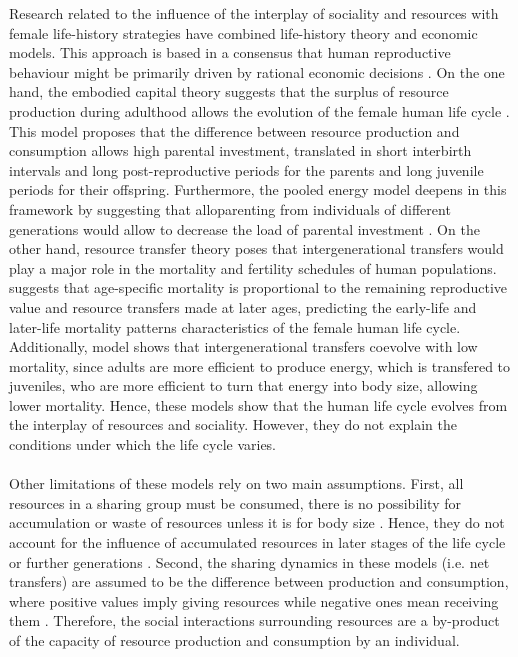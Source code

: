\documentclass{article}
\begin{document}
Research related to the influence of the interplay of sociality and resources with female life-history strategies have combined life-history theory and economic models. This approach is based in a consensus that human reproductive behaviour might be primarily driven by rational economic decisions \citep{jones2015resource}. On the one hand, the embodied capital theory suggests that the surplus of resource production during adulthood allows the evolution of the female human life cycle \citep{kaplan2000theory}. This model proposes that the difference between resource production and consumption allows high parental investment, translated in short interbirth intervals and long post-reproductive periods for the parents and long juvenile periods for their offspring. Furthermore, the pooled energy model deepens in this framework by suggesting that alloparenting from individuals of different generations would allow to decrease the load of parental investment \citep{kramer2010pooled}. On the other hand, resource transfer theory poses that intergenerational transfers would play a major role in the mortality and fertility schedules of human populations. \cite{lee2003rethinking} suggests that age-specific mortality is proportional to the remaining reproductive value and resource transfers made at later ages, predicting the early-life and later-life mortality patterns characteristics of the female human life cycle. Additionally, \cite{chu2006co} model shows that intergenerational transfers coevolve with low mortality, since adults are more efficient to produce energy, which is transfered to juveniles, who are more efficient to turn that energy into body size, allowing lower mortality. Hence, these models show that the human life cycle evolves from the interplay of resources and sociality. However, they do not explain the conditions under which the life cycle varies.
\\\\
Other limitations of these models rely on two main assumptions. First, all resources in a sharing group must be consumed, there is no possibility for accumulation or waste of resources \citep{lee2008sociality} unless it is for body size \citep{chu2006co,kaplan2003embodied}. Hence, they do not account for the influence of accumulated resources  in later stages of the life cycle or further generations \citep{goodman2012low}. Second, the sharing dynamics in these models (i.e. net transfers) are assumed to be the difference between production and consumption, where positive values imply giving resources while negative ones mean receiving them \citep{lee2003rethinking,lee2008sociality,chu2006co}. Therefore, the social interactions surrounding resources are a by-product of the capacity of resource production and consumption by an individual.
\end{document}
